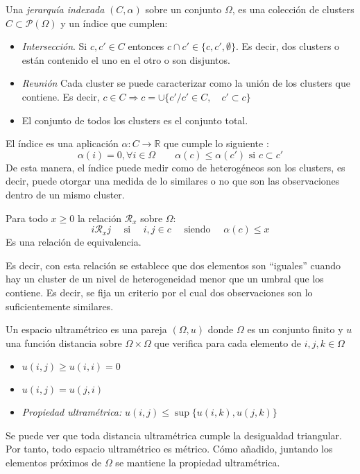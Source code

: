 \begin{defi}
Una \textit{jerarquía indexada} $(C,\alpha)$ sobre un conjunto $\Omega$, es una colección de clusters $C\subset \mathcal{P}(\Omega)$ y un índice que cumplen:
\begin{itemize}
\item \textit{Intersección}. Si $c,c'\in C$ entonces $c\cap c'\in\lbrace c, c', \emptyset\rbrace$. Es decir, dos clusters o están contenido el uno en el otro o son disjuntos. 
\item \textit{Reunión} Cada cluster se puede caracterizar como la unión de los clusters que contiene. Es decir, $c\in C \Rightarrow c=\cup \lbrace c'/c'\in C, \quad c'\subset c\rbrace$
\item El conjunto de todos los clusters es el conjunto total.
\end{itemize}

\noindent El índice es una aplicación $\alpha:C \rightarrow \mathbb{R}$ que cumple lo siguiente :
\begin{equation}
\alpha(i)=0, \forall i\in\Omega \quad\quad \alpha(c)\leq \alpha(c') \text{ si } c\subset c'
\end{equation}
De esta manera, el índice puede medir como de heterogéneos son los clusters, es decir, puede otorgar una medida de lo similares o no que son las observaciones dentro de un mismo cluster. 
\end{defi}

\begin{propo}
Para todo $x\geq 0 $ la relación $\mathcal{R}_x$ sobre $\Omega$:
\begin{equation}
i\mathcal{R}_x j \quad \text{ si } \quad i,j\in c \quad \text{ siendo }\quad\alpha(c)\leq x
\end{equation}
Es una relación de equivalencia.
\end{propo}
\noindent Es decir, con esta relación se establece que dos elementos son ``iguales'' cuando hay un cluster de un nivel de heterogeneidad menor que un umbral que los contiene. Es decir, se fija un criterio por el cual dos observaciones son lo suficientemente similares.

\newpage
\begin{defi}
Un espacio ultramétrico es una pareja $(\Omega,u)$ donde $\Omega$ es un conjunto finito y $u$ una función distancia sobre $\Omega\times \Omega $ que verifica para cada elemento de $i,j,k\in \Omega$
\begin{itemize}
\item $u(i,j)\geq u(i,i)=0$
\item $u(i,j)=u(j,i)$
\item \textit{Propiedad ultramétrica: } $u(i,j)\leq \sup \lbrace u(i,k),u(j,k)\rbrace $
\end{itemize}
\end{defi}
\noindent Se puede ver que toda distancia ultramétrica cumple la desigualdad triangular. Por tanto, todo espacio ultramétrico es métrico. Cómo añadido, juntando los elementos próximos de $\Omega$ se mantiene la propiedad ultramétrica. 

